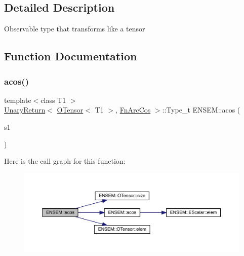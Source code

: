 \subsection{Detailed Description}
Observable type that transforms like a tensor 

\subsection{Function Documentation}
\mbox{\label{group__obstensor_gae3685afbb0e9aa5d37b76c81e344a490}} 
\subsubsection{\texorpdfstring{acos()}{acos()}}
{\footnotesize\ttfamily template$<$class T1 $>$ \\
\mbox{\hyperlink{structENSEM_1_1UnaryReturn}{Unary\+Return}}$<$ \mbox{\hyperlink{classENSEM_1_1OTensor}{O\+Tensor}}$<$ T1 $>$, \mbox{\hyperlink{structENSEM_1_1FnArcCos}{Fn\+Arc\+Cos}} $>$\+::Type\+\_\+t E\+N\+S\+E\+M\+::acos (\begin{DoxyParamCaption}\item[{const \mbox{\hyperlink{classENSEM_1_1OTensor}{O\+Tensor}}$<$ T1 $>$ \&}]{s1 }\end{DoxyParamCaption})\hspace{0.3cm}{\ttfamily [inline]}}

Here is the call graph for this function\+:\nopagebreak
\begin{figure}[H]
\begin{center}
\leavevmode
\includegraphics[width=350pt]{de/d87/group__obstensor_gae3685afbb0e9aa5d37b76c81e344a490_cgraph}
\end{center}
\end{figure}
\mbox{\label{group__obstensor_ga3c5e5939e51cda2594e94fd03c07ab8b}} 
